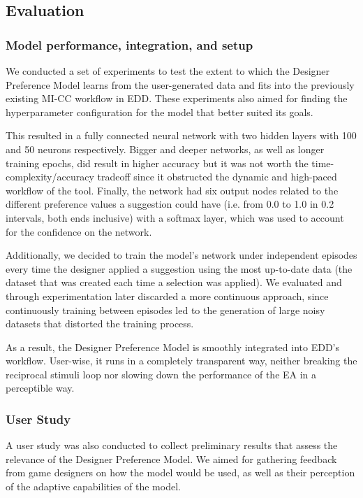 \subsection{Evaluation} \label{p5section/experiment}


\subsubsection{Model performance, integration, and setup}
We conducted a set of experiments to test the extent to which the Designer Preference Model learns from the user-generated data and fits into the previously existing MI-CC workflow in EDD. These experiments also aimed for finding the hyperparameter configuration for the model that better suited its goals. 

This resulted in a fully connected neural network with two hidden layers with 100 and 50 neurons respectively. Bigger and deeper networks, as well as longer training epochs, did result in higher accuracy but it was not worth the time-complexity/accuracy tradeoff since it obstructed the dynamic and high-paced workflow of the tool. Finally, the network had six output nodes related to the different preference values a suggestion could have (i.e. from 0.0 to 1.0 in 0.2 intervals, both ends inclusive) with a softmax layer, which was used to account for the confidence on the network.

Additionally, we decided to train the model's network under independent episodes every time the designer applied a suggestion using the most up-to-date data (the dataset that was created each time a selection was applied). We evaluated and through experimentation later discarded a more continuous approach, since continuously training between episodes led to the generation of large noisy datasets that distorted the training process. 

As a result, the Designer Preference Model is smoothly integrated into EDD's workflow. User-wise, it runs in a completely transparent way, neither breaking the reciprocal stimuli loop nor slowing down the performance of the EA in a perceptible way. 

\subsubsection{User Study}
A user study was also conducted to collect preliminary results that assess the relevance of the Designer Preference Model. We aimed for gathering feedback from game designers on how the model would be used, as well as their perception of the adaptive capabilities of the model. 

